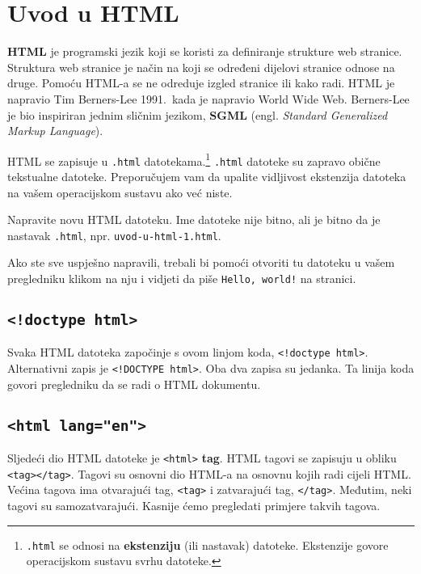 \newpage
\section{Uvod u HTML}\label{sec:uvod-u-html}

\textbf{HTML} je programski jezik koji se koristi za definiranje strukture web stranice.
Struktura web stranice je način na koji se određeni dijelovi stranice odnose na druge.
Pomoću HTML-a se ne odreduje izgled stranice ili kako radi.
HTML je napravio Tim Berners-Lee 1991.\ kada je napravio World Wide Web.
Berners-Lee je bio inspiriran jednim sličnim jezikom, \textbf{SGML} (engl. \textit{Standard Generalized Markup Language}).

HTML se zapisuje u \verb|.html| datotekama.\footnote{\texttt{.html} se odnosi na \textbf{ekstenziju} (ili nastavak) datoteke. Ekstenzije govore operacijskom sustavu svrhu datoteke.}
\verb|.html| datoteke su zapravo obične tekstualne datoteke.
Preporučujem vam da upalite vidljivost ekstenzija datoteka na vašem operacijskom sustavu ako već niste.

Napravite novu HTML datoteku.
Ime datoteke nije bitno, ali je bitno da je nastavak \verb|.html|, npr. \verb|uvod-u-html-1.html|.



Ako ste sve uspješno napravili, trebali bi pomoći otvoriti tu datoteku u vašem pregledniku klikom na nju i vidjeti da piše \verb|Hello, world!| na stranici.

\subsection{\texttt{<!doctype html>}}\label{subsec:doctype-html}

Svaka HTML datoteka započinje s ovom linjom koda, \verb|<!doctype html>|.
Alternativni zapis je \verb|<!DOCTYPE html>|.
Oba dva zapisa su jedanka.
Ta linija koda govori pregledniku da se radi o HTML dokumentu.

\subsection{\texttt{<html lang="en">}}\label{subsec:html}

Sljedeći dio HTML datoteke je \lstinline!<html>! \textbf{tag}.
HTML tagovi se zapisuju u obliku \lstinline!<tag></tag>!.
Tagovi su osnovni dio HTML-a na osnovnu kojih radi cijeli HTML.
Većina tagova ima otvarajući tag, \lstinline!<tag>! i zatvarajući tag, \lstinline!</tag>!.
Međutim, neki tagovi su samozatvarajući.
Kasnije ćemo pregledati primjere takvih tagova.

